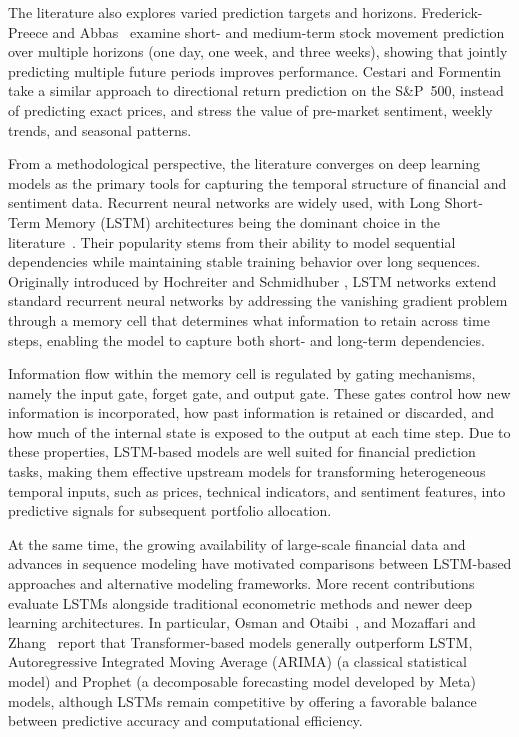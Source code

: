 The literature also explores varied prediction targets and horizons. Frederick-Preece and Abbas~\cite{2b4c0} examine short- and medium-term stock movement prediction over multiple horizons (one day, one week, and three weeks), showing that jointly predicting multiple future periods improves performance. Cestari and Formentin~\cite{d892a} take a similar approach to directional return prediction on the S\&P~500, instead of predicting exact prices, and stress the value of pre-market sentiment, weekly trends, and seasonal patterns.

From a methodological perspective, the literature converges on deep learning models as the primary tools for capturing the temporal structure of financial and sentiment data. Recurrent neural networks are widely used, with Long Short-Term Memory (LSTM) architectures being the dominant choice in the literature~\cite{9c443, 339f6, 93d76, a2e88, 34309}. Their popularity stems from their ability to model sequential dependencies while maintaining stable training behavior over long sequences. Originally introduced by Hochreiter and Schmidhuber \cite{LSTM1997}, LSTM networks extend standard recurrent neural networks by addressing the vanishing gradient problem through a memory cell that determines what information to retain across time steps, enabling the model to capture both short- and long-term dependencies.

Information flow within the memory cell is regulated by gating mechanisms, namely the input gate, forget gate, and output gate. These gates control how new information is incorporated, how past information is retained or discarded, and how much of the internal state is exposed to the output at each time step. Due to these properties, LSTM-based models are well suited for financial prediction tasks, making them effective upstream models for transforming heterogeneous temporal inputs, such as prices, technical indicators, and sentiment features, into predictive signals for subsequent portfolio allocation.

At the same time, the growing availability of large-scale financial data and advances in sequence modeling have motivated comparisons between LSTM-based approaches and alternative modeling frameworks. More recent contributions evaluate LSTMs alongside traditional econometric methods and newer deep learning architectures. In particular, Osman and Otaibi~\cite{ac95c}, and Mozaffari and Zhang~\cite{b58bb} report that Transformer-based models generally outperform LSTM, Autoregressive Integrated Moving Average (ARIMA) (a classical statistical model) and Prophet (a decomposable forecasting model developed by Meta) models, although LSTMs remain competitive by offering a favorable balance between predictive accuracy and computational efficiency.

